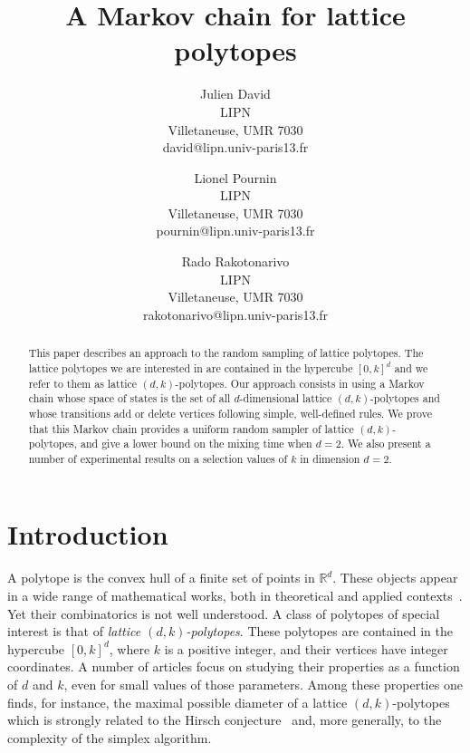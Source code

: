 \documentclass[a4paper]{article}
\title{A Markov chain for lattice polytopes}
\author{
Julien David \\ LIPN \\
              Villetaneuse, UMR 7030 \\ david@lipn.univ-paris13.fr
\and
Lionel Pournin \\ LIPN \\
              Villetaneuse, UMR 7030 \\ pournin@lipn.univ-paris13.fr
\and
Rado Rakotonarivo \\ LIPN \\
              Villetaneuse, UMR 7030 \\ rakotonarivo@lipn.univ-paris13.fr
}
\begin{document}
\maketitle

\begin{abstract}
This paper describes an approach to the random sampling of lattice polytopes. The lattice polytopes we are interested in are contained in the hypercube $[0,k]^d$ and we refer to them as lattice $(d,k)$-polytopes. Our approach consists in using a Markov chain whose space of states is the set of all $d$-dimensional lattice $(d,k)$-polytopes and whose transitions add or delete vertices following simple, well-defined rules. We prove that this Markov chain provides a uniform random sampler of lattice $(d, k)$-polytopes, and give a lower bound on the mixing time when $d=2$. We also present a number of experimental results on a selection values of $k$ in dimension $d=2$.
\end{abstract}
\vskip 32pt


\section{Introduction}

A polytope is the convex hull of a finite set of points in $\mathbb{R}^d$. These objects appear in a wide range of mathematical works, both in theoretical and applied contexts~\cite{ziegler1995lectures}. Yet their combinatorics is not well understood. A class of polytopes of special interest is that of \emph{lattice $(d,k)$-polytopes}. These polytopes are contained in the hypercube $[0,k]^d$, where $k$ is a positive integer, and their vertices have integer coordinates. A number of articles focus on studying their properties as a function of $d$ and $k$, even for small values of those parameters. Among these properties one finds, for instance, the maximal possible diameter of a lattice $(d,k)$-polytopes~\cite{DelPiaMichini2016,DezaManoussakisOnn2018,DezaPournin2018,KleinschmidtOnn1992,Naddef1989} which is strongly related to the Hirsch conjecture~\cite{BonifasDiSummaEisenbrandHahnleNiemeier2014,BorgwardtDeLoeraFinhold2016,KalaiKleitman1992,KleeWalkup1967,Santos2012} and, more generally, to the complexity of the simplex algorithm.
\end{document}
